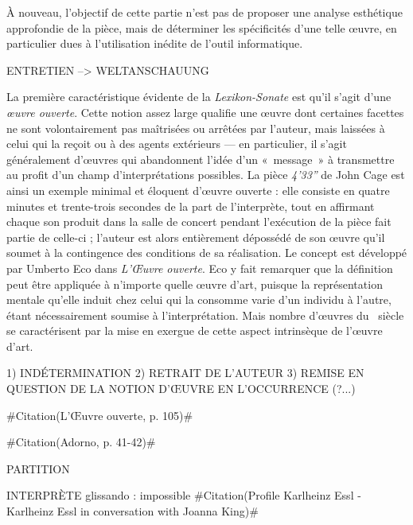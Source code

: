 \documentclass[a4paper,12pt]{article}
\newcommand{\guill}[1]{«~#1~»}
\newcommand{\zitat}[2]{\#Citation(#2)\#}
\begin{document}
À nouveau, l'objectif de cette partie n'est pas de proposer une analyse esthétique approfondie de la pièce, mais de déterminer les spécificités d'une telle œuvre, en particulier dues à l'utilisation inédite de l'outil informatique.

ENTRETIEN --> WELTANSCHAUUNG

La première caractéristique évidente de la \emph{Lexikon-Sonate} est qu'il s'agit d'une \emph{œuvre ouverte}. Cette notion assez large qualifie une œuvre dont certaines facettes ne sont volontairement pas maîtrisées ou arrêtées par l'auteur, mais laissées à celui qui la reçoit ou à des agents extérieurs --- en particulier, il s'agit généralement d'œuvres qui abandonnent l'idée d'un \guill{message} à transmettre au profit d'un champ d'interprétations possibles. La pièce \emph{4'33''} de John Cage est ainsi un exemple minimal et éloquent d'œuvre ouverte : elle consiste en quatre minutes et trente-trois secondes de la part de l'interprète, tout en affirmant chaque son produit dans la salle de concert pendant l'exécution de la pièce fait partie de celle-ci ; l'auteur est alors entièrement dépossédé de son œuvre qu'il soumet à la contingence des conditions de sa réalisation. Le concept est développé par Umberto Eco dans \emph{L'Œuvre ouverte}. Eco y fait remarquer que la définition peut être appliquée à n'importe quelle œuvre d'art, puisque la représentation mentale qu'elle induit chez celui qui la consomme varie d'un individu à l'autre, étant nécessairement soumise à l'interprétation. Mais nombre d'œuvres du \XXe~siècle se caractérisent par la mise en exergue de cette aspect intrinsèque de l'œuvre d'art.  


1) INDÉTERMINATION
2) RETRAIT DE L'AUTEUR
3) REMISE EN QUESTION DE LA NOTION D'ŒUVRE
EN L'OCCURRENCE (?...)

\zitat{Aujourd'hui, l'accent est mis sur le processus, sur la possibilité de saisir \emph{plusieurs ordres}. Dans la réception d'un message structuré de façon ouverte, l'\emph{attente} implique moins une \emph{prévision de l'attendu} qu'une \emph{attente de l'imprévu}.}
{L'Œuvre ouverte, p. 105}

\zitat{Contrainte par la logique de ses propres faits, la musique, en un mouvement critique, a dissous l'idée d'œuvre achevée et rompu avec le public. [\dots] Les seules œuvres qui comptent aujourd'hui sont celles qui ne sont plus des \guill{œuvres}.}
{Adorno, p. 41-42}


PARTITION

INTERPRÈTE
glissando : impossible
\zitat{I want to challenge the listener not just to consume the piece but by listening becoming something like a co-creator, being a partner of the composer and the composition itself.}
{Profile Karlheinz Essl - Karlheinz Essl in conversation with Joanna King}
\end{document}
